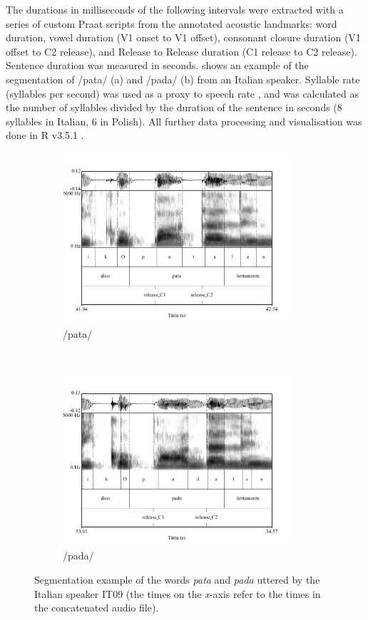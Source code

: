 \documentclass[12pt,]{article}
\begin{document}
The durations in milliseconds of the following intervals were extracted
with a series of custom Praat scripts from the annotated acoustic
landmarks: word duration, vowel duration (V1 onset to V1 offset),
consonant closure duration (V1 offset to C2 release), and Release to
Release duration (C1 release to C2 release). Sentence duration was
measured in seconds.  shows an example of the
segmentation of /pata/ (a) and /pada/ (b) from an Italian speaker.
Syllable rate (syllables per second) was used as a proxy to speech rate
\citep{plug2018a}, and was calculated as the number of syllables divided
by the duration of the sentence in seconds (8 syllables in Italian, 6 in
Polish). All further data processing and visualisation was done in R
v3.5.1 \citep{r-core-team2018, wickham2017}.

\begin{figure}
  \centering
  \begin{subfigure}[t]{0.5\textwidth}
    \centering
    \includegraphics[height=2.5in]{img/Figure1a.pdf}
    \caption{/pata/}
  \end{subfigure}%
  ~
  \begin{subfigure}[t]{0.5\textwidth}
    \centering
    \includegraphics[height=2.5in]{img/Figure1b.pdf}
    \caption{/pada/}
  \end{subfigure}
  \caption{Segmentation example of the words \textit{pata} and \textit{pada} uttered by the Italian speaker IT09 (the times on the \textit{x}-axis refer to the times in the concatenated audio file).}
  \label{f:segmentation}
\end{figure}
\end{document}
